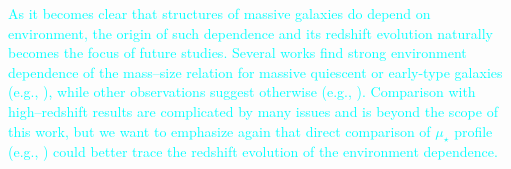 \documentclass[a4paper,fleqn,usenatbib]{mnras}
\def\mstar{{$M_{\star}$}}
\def\mden{{$\mu_{\star}$}}
\newcommand{\song}[1]{\textcolor{cyan}{#1}}
\begin{document}
    \song{
    As it becomes clear that structures of massive galaxies do depend on 
    environment, the origin of such dependence and its redshift evolution 
    naturally becomes the focus of future studies. 
    Several works find strong environment dependence of the mass--size relation 
    for massive quiescent or early-type galaxies
    (e.g., \citealt{Papovich2012, Bassett2013, Lani2013, Strazzullo2013, 
    Delaye2014}), while other observations suggest otherwise (e.g., 
    \citealt{Rettura2010, Raichoor2012, Kelkar2015, Allen2015}). 
    Comparison with high--redshift results are complicated by many issues and 
    is beyond the scope of this work, but we want to emphasize again that 
    direct comparison of \mden{} profile (e.g., \citealt{Szomoru2012, Patel2013, 
    Buitrago2017, Hill2017}) could better trace the redshift evolution of the
    environment dependence. 
    }
    
    
\end{document}
